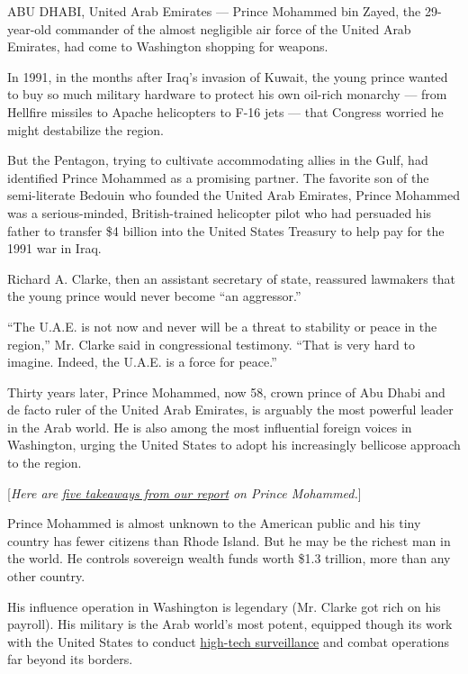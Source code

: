 ABU DHABI, United Arab Emirates --- Prince Mohammed bin Zayed, the
29-year-old commander of the almost negligible air force of the United
Arab Emirates, had come to Washington shopping for weapons.

In 1991, in the months after Iraq's invasion of Kuwait, the young prince
wanted to buy so much military hardware to protect his own oil-rich
monarchy --- from Hellfire missiles to Apache helicopters to F-16 jets
--- that Congress worried he might destabilize the region.

But the Pentagon, trying to cultivate accommodating allies in the Gulf,
had identified Prince Mohammed as a promising partner. The favorite son
of the semi-literate Bedouin who founded the United Arab Emirates,
Prince Mohammed was a serious-minded, British-trained helicopter pilot
who had persuaded his father to transfer \$4 billion into the United
States Treasury to help pay for the 1991 war in Iraq.

Richard A. Clarke, then an assistant secretary of state, reassured
lawmakers that the young prince would never become ``an aggressor.''

``The U.A.E. is not now and never will be a threat to stability or peace
in the region,'' Mr. Clarke said in congressional testimony. ``That is
very hard to imagine. Indeed, the U.A.E. is a force for peace.''

Thirty years later, Prince Mohammed, now 58, crown prince of Abu Dhabi
and de facto ruler of the United Arab Emirates, is arguably the most
powerful leader in the Arab world. He is also among the most influential
foreign voices in Washington, urging the United States to adopt his
increasingly bellicose approach to the region.

{[}\emph{Here are}
\href{https://www.nytimes.com/2019/06/02/world/middleeast/prince-mohammed-bin-zayed.html}{\emph{five
takeaways from our report}} \emph{on Prince Mohammed.}{]}

Prince Mohammed is almost unknown to the American public and his tiny
country has fewer citizens than Rhode Island. But he may be the richest
man in the world. He controls sovereign wealth funds worth \$1.3
trillion, more than any other country.

His influence operation in Washington is legendary (Mr. Clarke got rich
on his payroll). His military is the Arab world's most potent, equipped
though its work with the United States to conduct
\href{https://www.nytimes.com/2018/08/31/world/middleeast/hacking-united-arab-emirates-nso-group.html}{high-tech
surveillance} and combat operations far beyond its borders.

